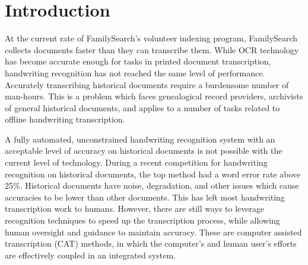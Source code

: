 \documentclass[ms]{byuprop}
\title{\Title}
\author{\Author}
\begin{document}
\maketitle

\section{Introduction}
At the current rate of FamilySearch's volunteer indexing program, FamilySearch collects documents faster than they can transcribe them. While OCR technology has become accurate enough for tasks in printed document transcription, handwriting recognition has not reached the same level of performance. Accurately transcribing historical documents require a burdensome number of man-hours. This is a problem which faces genealogical record providers, archivists of general historical documents, and applies to a number of tasks related to offline handwriting transcription.

A fully automated, unconstrained handwriting recognition system with an acceptable level of accuracy on historical documents is not possible with the current level of technology. During a recent competition for handwriting recognition on historical documents, the top method had a word error rate above 25\%\cite{icdarComp2015}.  Historical documents have noise, degradation, and other issues which cause accuracies to be lower than other documents. This has left most handwriting transcription work to humans. However, there are still ways to leverage recognition techniques to speed up the transcription process, while allowing human oversight and guidance to maintain accuracy. These are computer assisted transcription (CAT) methods, in which the computer's and human user's efforts are effectively coupled in an integrated system.

\end{document}

